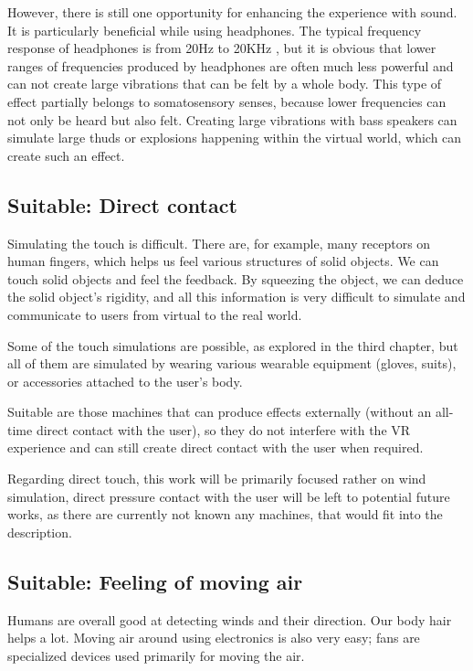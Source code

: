 However, there is still one opportunity for enhancing the experience with sound.
It is particularly beneficial while using headphones. The typical frequency
response of headphones is from 20Hz to 20KHz \cite{freqresp}, but it is obvious
that lower ranges of frequencies produced by headphones are often much
less powerful and can not create large vibrations that can be felt by a whole
body. This type of effect partially belongs to somatosensory senses, because
lower frequencies can not only be heard but also felt. Creating large
vibrations with bass speakers can simulate large thuds or explosions
happening within the virtual world, which can create such an effect.


\hypertarget{x-suitable:-direct-contact}{\subsection{Suitable: Direct contact}}
Simulating the touch is difficult. There are, for example, many receptors on
human fingers, which helps us feel various structures of solid
objects. We can touch solid objects and feel the feedback. By squeezing the
object, we can deduce the solid object’s rigidity, and all this
information is very difficult to simulate and communicate to users from
virtual to the real world.


Some of the touch simulations are possible, as explored in the third chapter, but all
of them are simulated by wearing various wearable equipment (gloves, suits),
or accessories attached to the user’s body.


Suitable are those machines that can produce effects externally (without an
all-time direct contact with the user), so they do not interfere with the VR
experience and can still create direct contact with the user when required.


Regarding direct touch, this work will be primarily
focused rather on wind simulation, direct pressure contact with the user will
be left to potential future works, as there are currently not known any
machines, that would fit into the description.


\hypertarget{x-suitable:-feeling-of-moving-air}{\subsection{Suitable: Feeling of moving air}}
Humans are overall good at detecting winds and their direction. Our body hair
helps a lot. Moving air around using electronics is also very easy; fans
are specialized devices used primarily for moving the air.


